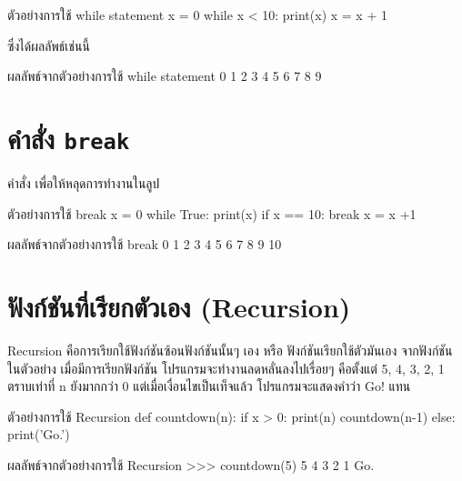 \begin{codelist}{ตัวอย่างการใช้ while statement}{}
x = 0
while x < 10:
    print(x)
    x = x + 1
\end{codelist}

ซึ่งได้ผลลัพธ์เช่นนี้


\begin{codelist}{ผลลัพธ์จากตัวอย่างการใช้ while statement}{}
0
1
2
3
4
5
6
7
8
9
\end{codelist}

\section{คำสั่ง \texttt{break}}

คำสั่ง   เพื่อให้หลุดการทำงานในลูป

\begin{codelist}{ตัวอย่างการใช้ break}{}
x = 0
while True:
    print(x)
    if x == 10: break
    x = x +1
\end{codelist}

\begin{codelist}{ผลลัพธ์จากตัวอย่างการใช้ break}{}
0
1
2
3
4
5
6
7
8
9
10
\end{codelist}


\section{ฟังก์ชันที่เรียกตัวเอง (Recursion)}

Recursion คือการเรียกใช้ฟังก์ชันซ้อนฟังก์ชันนั้นๆ เอง หรือ ฟังก์ชันเรียกใช้ตัวมันเอง จากฟังก์ชัน   ในตัวอย่าง เมื่อมีการเรียกฟังก์ชัน   โปรแกรมจะทำงานลดหลั่นลงไปเรื่อยๆ คือตั้งแต่ 5, 4, 3, 2, 1 ตราบเท่าที่ n ยังมากกว่า 0 แต่เมื่อเงื่อนไขเป็นเท็จแล้ว โปรแกรมจะแสดงคำว่า Go! แทน


\begin{codelist}{ตัวอย่างการใช้ Recursion}{}
def countdown(n):
    if x > 0:
        print(n)
        countdown(n-1)
    else:
        print('Go.')
\end{codelist}

\begin{codelist}{ผลลัพธ์จากตัวอย่างการใช้ Recursion}{}
>>> countdown(5)
5
4
3
2
1
Go.
\end{codelist}


